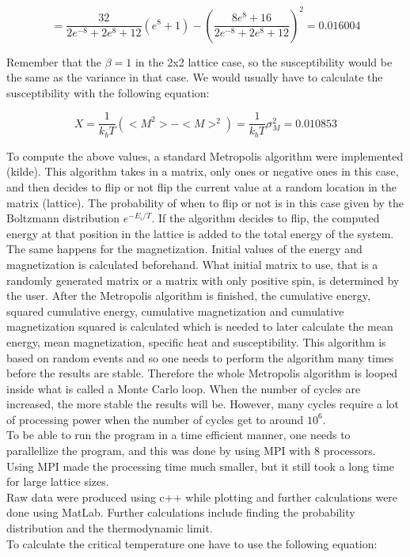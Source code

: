 \documentclass[10pt,a4paper]{article}
\begin{document}
$$
 = \frac{32}{2e^{-8} + 2e^8 + 12}(e^{8}+1) - (\frac{8e^8 + 16}{2e^{-8} + 2e^8 + 12})^2 = 0.016004
$$

\noindent Remember that the $\beta = 1$ in the 2x2 lattice case, so the susceptibility would be the same as the variance in that case. We would usually have to calculate the susceptibility with the following equation:

$$
X = \frac{1}{k_bT}(<M^2> - <M>^2) = \frac{1}{k_bT}\sigma_M^2 = 0.010853
$$

\noindent To compute the above values, a standard Metropolis algorithm were implemented (kilde). This algorithm takes in a matrix, only ones or negative ones in this case, and then decides to flip or not flip the current value at a random location in the matrix (lattice). The probability of when to flip or not is in this case given by the Boltzmann distribution $e^{-E_i / T}$. If the algorithm decides to flip, the computed energy at that position in the lattice is added to the total energy of the system. The same happens for the magnetization. Initial values of the energy and magnetization is calculated beforehand. What initial matrix to use, that is a randomly generated matrix or a matrix with only positive spin, is determined by the user. After the Metropolis algorithm is finished, the cumulative energy, squared cumulative energy, cumulative magnetization and cumulative magnetization squared is calculated which is needed to later calculate the mean energy, mean magnetization, specific heat and susceptibility. This algorithm is based on random events and so one needs to perform the algorithm many times before the results are stable. Therefore the whole Metropolis algorithm is looped inside what is called a Monte Carlo loop. When the number of cycles are increased, the more stable the results will be. However, many cycles require a lot of processing power when the number of cycles get to around $10^6$.
\\
To be able to run the program in a time efficient manner, one needs to parallellize the program, and this was done by using MPI with 8 processors. Using MPI made the processing time much smaller, but it still took a long time for large lattice sizes.
\\
Raw data were produced using c++ while plotting and further calculations were done using MatLab. Further calculations include finding the probability distribution and the thermodynamic limit.  
\\
To calculate the critical temperature one have to use the following equation:
\end{document}
